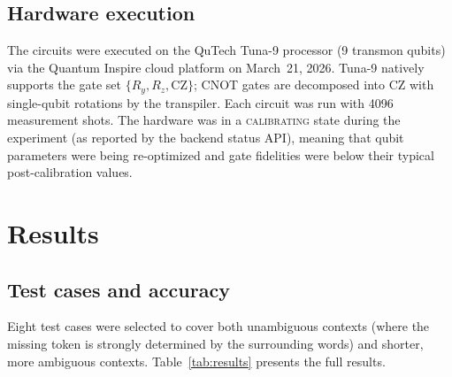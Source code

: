 \documentclass[prl,twocolumn,superscriptaddress,longbibliography,floatfix]{revtex4-2}
\begin{document}
\subsection{Hardware execution}

The circuits were executed on the QuTech Tuna-9 processor (9 transmon qubits) via the Quantum Inspire cloud platform on March~21, 2026. Tuna-9 natively supports the gate set $\{R_y, R_z, \text{CZ}\}$; CNOT gates are decomposed into CZ with single-qubit rotations by the transpiler. Each circuit was run with 4096 measurement shots. The hardware was in a \textsc{calibrating} state during the experiment (as reported by the backend status API), meaning that qubit parameters were being re-optimized and gate fidelities were below their typical post-calibration values.

\section{Results}

\subsection{Test cases and accuracy}

Eight test cases were selected to cover both unambiguous contexts (where the missing token is strongly determined by the surrounding words) and shorter, more ambiguous contexts. Table~\ref{tab:results} presents the full results.
\end{document}
